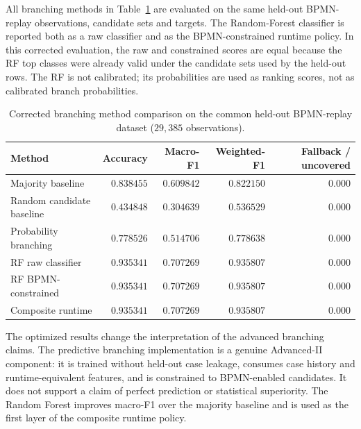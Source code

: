 All branching methods in Table~\ref{tab:branching_corrected_methods_joao} are
evaluated on the same held-out BPMN-replay observations, candidate sets and
targets. The Random-Forest classifier is reported both as a raw classifier and
as the BPMN-constrained runtime policy. In this corrected evaluation, the raw
and constrained scores are equal because the RF top classes were already valid
under the candidate sets used by the held-out rows. The RF is not calibrated;
its probabilities are used as ranking scores, not as calibrated branch
probabilities.

\begin{table}[H]
    \caption{Corrected branching method comparison on the common held-out
    BPMN-replay dataset ($29{,}385$ observations).}
    \centering
    \renewcommand{\arraystretch}{1.1}
    \scriptsize
    \begin{tabular}{lrrrr}
        \toprule
        \textbf{Method} & \textbf{Accuracy} & \textbf{Macro-F1} &
        \textbf{Weighted-F1} & \textbf{Fallback / uncovered} \\
        \midrule
        Majority baseline & $0.838455$ & $0.609842$ & $0.822150$ & $0.000$ \\
        Random candidate baseline & $0.434848$ & $0.304639$ & $0.536529$ & $0.000$ \\
        Probability branching & $0.778526$ & $0.514706$ & $0.778638$ & $0.000$ \\
        RF raw classifier & $0.935341$ & $0.707269$ & $0.935807$ & $0.000$ \\
        RF BPMN-constrained & $0.935341$ & $0.707269$ & $0.935807$ & $0.000$ \\
        Composite runtime & $0.935341$ & $0.707269$ & $0.935807$ & $0.000$ \\
        \bottomrule
    \end{tabular}
    \label{tab:branching_corrected_methods_joao}
\end{table}

The optimized results change the interpretation of the advanced branching
claims. The predictive branching implementation is a genuine Advanced-II
component: it is trained without held-out case leakage, consumes case history
and runtime-equivalent features, and is constrained to BPMN-enabled candidates.
It does not support a claim of perfect prediction or statistical superiority.
The Random Forest improves macro-F1 over the majority baseline and is used as
the first layer of the composite runtime policy.

